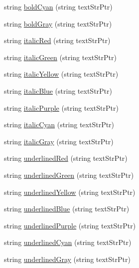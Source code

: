 \begin{DoxyCompactItemize}
string \hyperlink{namespace_windows_console_text_a40f10578dd275bf71f2b990611b2cb3b}{bold\-Cyan} (string text\-Str\-Ptr)
\item 
string \hyperlink{namespace_windows_console_text_a880cbbbb95aa7acd07c0754f680e226f}{bold\-Gray} (string text\-Str\-Ptr)
\item 
string \hyperlink{namespace_windows_console_text_a333160cb666d4b24412f685169fd41fe}{italic\-Red} (string text\-Str\-Ptr)
\item 
string \hyperlink{namespace_windows_console_text_a2593868186dccf1010fdce6d99cad32f}{italic\-Green} (string text\-Str\-Ptr)
\item 
string \hyperlink{namespace_windows_console_text_a192d65550fabaa40d29212970647f7e9}{italic\-Yellow} (string text\-Str\-Ptr)
\item 
string \hyperlink{namespace_windows_console_text_a749a94269bbee0bfe6e86a8825643e7f}{italic\-Blue} (string text\-Str\-Ptr)
\item 
string \hyperlink{namespace_windows_console_text_a48a683396f6c4632267863c3548d40ff}{italic\-Purple} (string text\-Str\-Ptr)
\item 
string \hyperlink{namespace_windows_console_text_a70616ef811613efcf6941856236f4a9d}{italic\-Cyan} (string text\-Str\-Ptr)
\item 
string \hyperlink{namespace_windows_console_text_afb933fa51573ec03b37f590980f098f3}{italic\-Gray} (string text\-Str\-Ptr)
\item 
string \hyperlink{namespace_windows_console_text_a646b2fd9328197cb93a86e12974608ac}{underlined\-Red} (string text\-Str\-Ptr)
\item 
string \hyperlink{namespace_windows_console_text_af866a9ce58eb38d4954a8d7f20f023f1}{underlined\-Green} (string text\-Str\-Ptr)
\item 
string \hyperlink{namespace_windows_console_text_ac51aae3f0176b35026e18efd8b8efe4e}{underlined\-Yellow} (string text\-Str\-Ptr)
\item 
string \hyperlink{namespace_windows_console_text_a302fb0a43cacb69d0ff743eb4fda697e}{underlined\-Blue} (string text\-Str\-Ptr)
\item 
string \hyperlink{namespace_windows_console_text_a44b5d2e893c16099a7e9cf9adddfe51f}{underlined\-Purple} (string text\-Str\-Ptr)
\item 
string \hyperlink{namespace_windows_console_text_a5869ce0573b676502248ba8b6c6d1d82}{underlined\-Cyan} (string text\-Str\-Ptr)
\item 
string \hyperlink{namespace_windows_console_text_a89d8a738f21aab8ecf2c4e5fee065443}{underlined\-Gray} (string text\-Str\-Ptr)
\end{DoxyCompactItemize}


